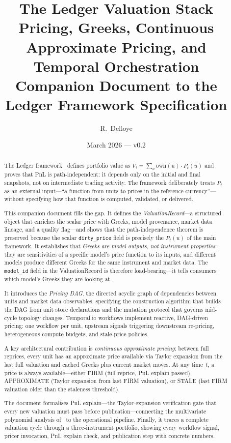 \documentclass[11pt,a4paper]{article}
\title{The Ledger Valuation Stack\\[6pt]
\large Pricing, Greeks, Continuous Approximate Pricing, and Temporal Orchestration\\[4pt]
\normalsize Companion Document to the Ledger Framework Specification}
\author{R.\ Delloye}
\date{March 2026 --- v0.2}
\begin{document}
\maketitle

\begin{abstract}
The Ledger framework~\cite{ledger} defines portfolio value as $V_t = \sum_u \mathrm{own}(u) \cdot P_t(u)$ and proves that PnL is path-independent: it depends only on the initial and final snapshots, not on intermediate trading activity.  The framework deliberately treats $P_t$ as an external input---``a function from units to prices in the reference currency''---without specifying how that function is computed, validated, or delivered.

This companion document fills the gap.  It defines the \emph{ValuationRecord}---a structured object that enriches the scalar price with Greeks, model provenance, market data lineage, and a quality flag---and shows that the path-independence theorem is preserved because the scalar \texttt{dirty\_price} field is precisely the $P_t(u)$ of the main framework.  It establishes that \emph{Greeks are model outputs, not instrument properties}: they are sensitivities of a specific model's price function to its inputs, and different models produce different Greeks for the same instrument and market data.  The \texttt{model\_id} field in the ValuationRecord is therefore load-bearing---it tells consumers which model's Greeks they are looking at.

It introduces the \emph{Pricing DAG}, the directed acyclic graph of dependencies between units and market data observables, specifying the construction algorithm that builds the DAG from unit store declarations and the mutation protocol that governs mid-cycle topology changes.  Temporal.io workflows implement reactive, DAG-driven pricing: one workflow per unit, upstream signals triggering downstream re-pricing, heterogeneous compute budgets, and stale-price policies.

A key architectural contribution is \emph{continuous approximate pricing}: between full reprices, every unit has an approximate price available via Taylor expansion from the last full valuation and cached Greeks plus current market moves.  At any time~$t$, a price is always available---either FIRM (full reprice, PnL explain passed), APPROXIMATE (Taylor expansion from last FIRM valuation), or STALE (last FIRM valuation older than the staleness threshold).

The document formalises PnL explain---the Taylor-expansion verification gate that every new valuation must pass before publication---connecting the multivariate polynomial analysis of~\cite{pnl_explain} to the operational pipeline.  Finally, it traces a complete valuation cycle through a three-instrument portfolio, showing every workflow signal, pricer invocation, PnL explain check, and publication step with concrete numbers.


\end{abstract}
\end{document}
